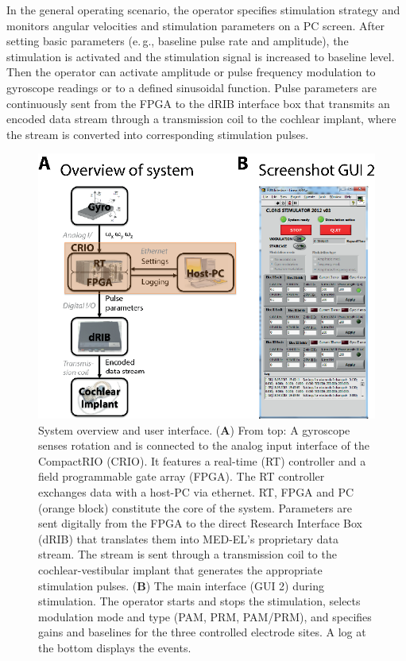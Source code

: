 	In the general operating scenario, the operator specifies stimulation strategy and monitors angular velocities and stimulation parameters on a PC screen. After setting basic parameters (e.\,g., baseline pulse rate  and amplitude), the stimulation is activated and the stimulation signal is increased to baseline level. Then the operator can activate amplitude or pulse frequency modulation to gyroscope readings or to a defined sinusoidal function. Pulse parameters are continuously sent from the FPGA to the dRIB interface box that transmits an encoded data stream through a transmission coil to the cochlear implant, where the stream is converted into corresponding stimulation pulses.
\begin{figure}[btp]
\centering
\includegraphics{chapters/partii/crio/figures/Fig_CRIO_overview.eps} 
\caption[CompactRIO system overview and user interface]{System overview and user interface. (\textbf{A}) From top: A gyroscope senses rotation and is connected to the analog input interface of the CompactRIO (CRIO). It features a real-time (RT) controller and a field programmable gate array (FPGA). The RT controller exchanges data with a host-PC via ethernet. RT, FPGA and PC (orange block) constitute the core of the system. Parameters are sent digitally from the FPGA to the direct Research Interface Box (dRIB) that translates them into MED-EL’s proprietary data stream. The stream is sent through a transmission coil to the cochlear-vestibular implant that generates the appropriate stimulation pulses. (\textbf{B}) The main interface (GUI 2) during stimulation. The operator starts and stops the stimulation, selects modulation mode and type (PAM, PRM, PAM/PRM), and specifies gains and baselines for the three controlled electrode sites. A log at the bottom displays the events.}
\label{fig:crio:overview}
\end{figure}
	
